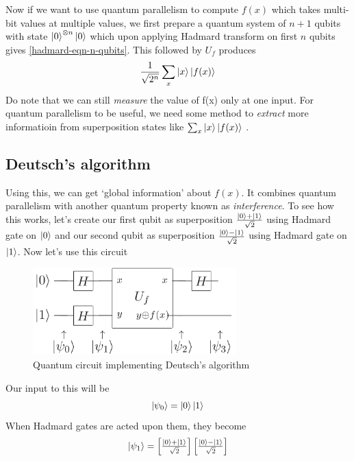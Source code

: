 Now if we want to use quantum parallelism to compute $f(x)$ which takes multi-bit values at multiple values, we first prepare a quantum system of $n+1$ qubits with state $\ket{0}^{\otimes n}\ket{0}$ which upon applying Hadmard transform on first $n$ qubits gives \ref{hadmard-eqn-n-qubits}. This followed by $U_f$ produces
\begin{equation}
    \frac{1}{\sqrt{2^n}}\sum_x \ket{x}\ket{f(x)}
\end{equation}
Do note that we can still \textit{measure} the value of f(x) only at one input. For quantum parallelism to be useful, we need some method to \textit{extract} more informatioin from superposition states like $\sum_x\ket{x}\ket{f(x)}$ .

\subsection{Deutsch's algorithm}
Using this, we can get `global information' about $f(x)$. It combines quantum parallelism with another quantum property known as \textit{interference}. To see how this works, let's create our first qubit as superposition $\frac{\ket{0} + \ket{1}}{\sqrt{2}}$ using Hadmard gate on $\ket{0}$ and our second qubit as superposition $\frac{\ket{0}-\ket{1}}{\sqrt{2}}$ using Hadmard gate on $\ket{1}$. Now let's use this circuit
\begin{figure}[H]
    \centering
    \includegraphics[width=0.7\textwidth]{images/deutsch_algo.png}
    \caption{Quantum circuit implementing Deutsch's algorithm}
    \label{fig:deutsch-algo}
\end{figure}
Our input to this will be
\begin{equation}
    \ket{\psi_0} = \ket{0}\ket{1}
\end{equation}
When Hadmard gates are acted upon them, they become
\begin{equation}
    \ket{\psi_1} = \begin{bmatrix}
        \frac{\ket{0}+\ket{1}}{\sqrt{2}}
    \end{bmatrix}\begin{bmatrix}
        \frac{\ket{0}-\ket{1}}{\sqrt{2}}
    \end{bmatrix}
    \label{eq:U_f_deutsch}
\end{equation}
